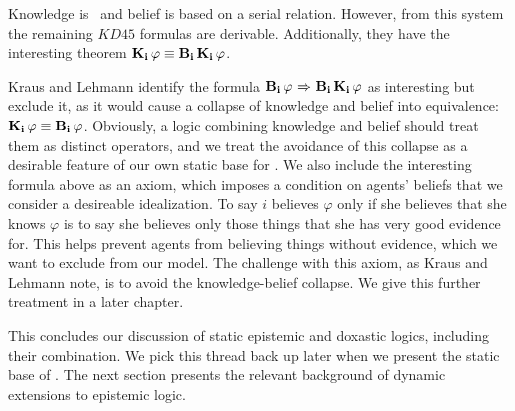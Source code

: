 Knowledge is \SFive\ and belief is based on a serial relation. However, from this system the remaining $\mathit{KD45}$ formulas are derivable. Additionally, they have the interesting theorem $\mathbf{K}_{\mathbf{i}}\,\varphi \equiv \mathbf{B}_{\mathbf{i}}\,\mathbf{K}_{\mathbf{i}}\,\varphi$. 

Kraus and Lehmann identify the formula $\mathbf{B}_{\mathbf{i}}\,\varphi {\ \Rightarrow \ } \mathbf{B}_{\mathbf{i}}\,\mathbf{K}_{\mathbf{i}}\,\varphi$ as interesting but exclude it, as it would cause a collapse of knowledge and belief into equivalence: $\mathbf{K}_{\mathbf{i}}\,\varphi \equiv \mathbf{B}_{\mathbf{i}}\,\varphi$. Obviously, a logic combining knowledge and belief should treat them as distinct operators, and we treat the avoidance of this collapse as a desirable feature of our own static base for \DASL. We also include the interesting formula above as an axiom, which imposes a condition on agents' beliefs that we consider a desireable idealization. To say $i$ believes $\varphi$ only if she believes that she knows $\varphi$ is to say she believes only those things that she has very good evidence for. This helps prevent agents from believing things without evidence, which we want to exclude from our model. The challenge with this axiom, as Kraus and Lehmann note, is to avoid the knowledge-belief collapse. We give this further treatment in a later chapter.

This concludes our discussion of static epistemic and doxastic logics, including their combination. We pick this thread back up later when we present the static base of \DASL. The next section presents the relevant background of dynamic extensions to epistemic logic.




